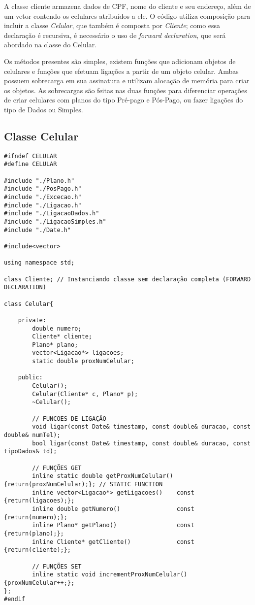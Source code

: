 A classe cliente armazena dados de CPF, nome do cliente e seu endereço, além de um vetor contendo os celulares atribuídos a ele. O código utiliza composição para incluir a classe \textit{Celular}, que também é composta por \textit{Cliente}; como essa declaração é recursiva, é necessário o uso de \textit{forward declaration}, que será abordado na classe do Celular. 

Os métodos presentes são simples, existem funções que adicionam objetos de celulares e funções que efetuam ligações a partir de um objeto celular. Ambas possuem sobrecarga em sua assinatura e utilizam alocação de memória para criar os objetos. As sobrecargas são feitas nas duas funções para diferenciar operações de criar celulares com planos do tipo Pré-pago e Pós-Pago, ou fazer ligações do tipo de Dados ou Simples.

\pagebreak
\subsection{Classe Celular} \label{sec:celular}

\begin{lstlisting}[basicstyle=\tiny]
#ifndef CELULAR
#define CELULAR

#include "./Plano.h"
#include "./PosPago.h"
#include "./Excecao.h"
#include "./Ligacao.h"
#include "./LigacaoDados.h"
#include "./LigacaoSimples.h"
#include "./Date.h"

#include<vector>

using namespace std;

class Cliente; // Instanciando classe sem declaração completa (FORWARD DECLARATION)

class Celular{

	private:
		double numero;
		Cliente* cliente;
		Plano* plano;
		vector<Ligacao*> ligacoes;
		static double proxNumCelular;
	
	public:
		Celular();
		Celular(Cliente* c, Plano* p);
		~Celular();
		
		// FUNCOES DE LIGAÇÃO
		void ligar(const Date& timestamp, const double& duracao, const double& numTel);
		bool ligar(const Date& timestamp, const double& duracao, const tipoDados& td);
		
		// FUNÇÕES GET
		inline static double getProxNumCelular()       {return(proxNumCelular);}; // STATIC FUNCTION
		inline vector<Ligacao*> getLigacoes()    const {return(ligacoes);};
		inline double getNumero()                const {return(numero);};
		inline Plano* getPlano()                 const {return(plano);};
		inline Cliente* getCliente()             const {return(cliente);};
		
		// FUNÇÕES SET
		inline static void incrementProxNumCelular() {proxNumCelular++;};
};
#endif
\end{lstlisting}

